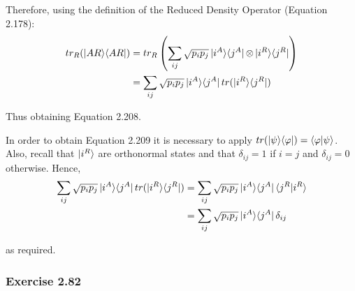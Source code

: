 Therefore, using the definition of the Reduced Density Operator (Equation 2.178):
\begin{align}
    tr_R(\mathop{\mathinner{ |{AR}\rangle \langle{AR}|}}) &= tr_R \left( \sum_{ij} \sqrt{p_i p_j}
        \mathop{\mathinner{ |{i^A}\rangle \langle{j^A}|}} \otimes \mathop{\mathinner{ |{i^R}\rangle \langle{j^R}|}} \right) \\
    &= \sum_{ij} \sqrt{p_i p_j} \mathop{\mathinner{ |{i^A}\rangle \langle{j^A}|}} tr(\mathop{\mathinner{ |{i^R}\rangle \langle{j^R}|}}) \\
\end{align}

Thus obtaining Equation 2.208.

In order to obtain Equation 2.209 it is necessary to apply
\hyperref[sec:nielsen-and-chuang-trace-of-ketbra-equals-braket]
{$tr(\mathop{\mathinner{ |{\psi}\rangle \langle{\varphi}|}}) = \mathop{\mathinner{ \langle{\varphi}|{\psi}\rangle}}$}.
Also, recall that $\ket{i^R}$ are orthonormal states and that
$\delta_{ij} = 1$ if $i = j$ and $\delta_{ij} = 0$ otherwise.
Hence,
\begin{align}
    \sum_{ij} \sqrt{p_i p_j} \mathop{\mathinner{ |{i^A}\rangle \langle{j^A}|}} tr(\mathop{\mathinner{ |{i^R}\rangle \langle{j^R}|}}) &=
        \sum_{ij} \sqrt{p_i p_j} \mathop{\mathinner{ |{i^A}\rangle \langle{j^A}|}} \mathop{\mathinner{ \langle{j^R}|{i^R}\rangle}} \\
    &= \sum_{ij} \sqrt{p_i p_j} \mathop{\mathinner{ |{i^A}\rangle \langle{j^A}|}} \delta_{ij}
\end{align}

as required.

\subsubsection{Exercise 2.82}
\label{sec:nielsen-and-chuang-exercise-2-82}

